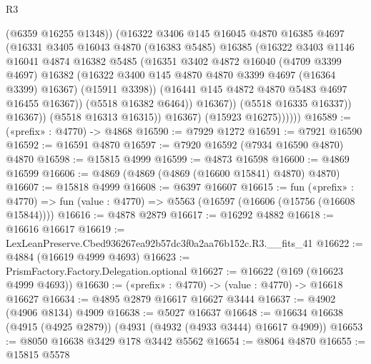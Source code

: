 \begin{lexlean}{R3}
\begin{coremodule}
                            (@6359 @16255 @1348))
                          (@16322
                            @3406
                            @145
                            @16045
                            @4870
                            @16385
                            @4697
                            (@16331
                              @3405
                              @16043
                              @4870
                              (@16383 @5485)
                              @16385
                              (@16322
                                @3403
                                @1146
                                @16041
                                @4874
                                @16382
                                @5485
                                (@16351
                                  @3402
                                  @4872
                                  @16040
                                  (@4709 @3399 @4697)
                                  @16382
                                  (@16322 @3400 @145 @4870 @4870 @3399 @4697 (@16364 @3399) @16367)
                                  (@15911 @3398))
                                (@16441 @145 @4872 @4870 @5483 @4697 @16455 @16367))
                              (@5518 @16382 @6464))
                            @16367))
                        (@5518 @16335 @16337))
                      @16367))
                  (@5518 @16313 @16315))
                @16367)
              (@15923 @16275))))))
@16589 := («prefix» : @4770) -> @4868
@16590 := @7929 @1272
@16591 := @7921 @16590
@16592 := @16591 @4870
@16597 := @7920 @16592 (@7934 @16590 @4870) @4870
@16598 := @15815 @4999
@16599 := @4873 @16598
@16600 := @4869 @16599
@16606 := @4869 (@4869 (@4869 (@16600 @15841) @4870) @4870)
@16607 := @15818 @4999
@16608 := @6397 @16607
@16615 := fun («prefix» : @4770) =>
  fun (value : @4770) => @5563 (@16597 (@16606 (@15756 (@16608 @15844))))
@16616 := @4878 @2879
@16617 := @16292 @4882
@16618 := @16616 @16617
@16619 := LexLeanPreserve.Cbed936267ea92b57dc3f0a2aa76b152c.R3.__fits_41
@16622 := @4884 (@16619 @4999 @4693)
@16623 := PrismFactory.Factory.Delegation.optional
@16627 := @16622 (@169 (@16623 @4999 @4693))
@16630 := («prefix» : @4770) -> (value : @4770) -> @16618 @16627
@16634 := @4895 @2879 @16617 @16627 @3444
@16637 := @4902 (@4906 @8134) @4909
@16638 := @5027 @16637
@16648 := @16634 @16638 (@4915 (@4925 @2879)) (@4931 (@4932 (@4933 @3444) @16617 @4909))
@16653 := @8050 @16638 @3429 @178 @3442 @5562
@16654 := @8064 @4870
@16655 := @15815 @5578

\end{coremodule}
\end{lexlean}
